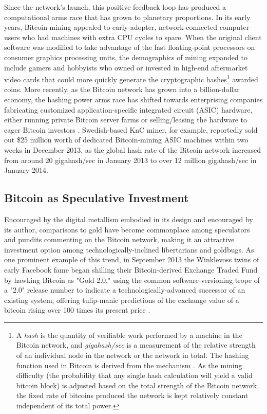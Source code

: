 Since the network's launch, this positive feedback loop has produced a computational arms race that has grown to planetary proportions. In its early years, Bitcoin mining appealed to early-adopter, network-connected computer users who had machines with extra CPU cycles to spare. When the original client software was modified to take advantage of the fast floating-point processors on consumer graphics processing units, the demographics of mining expanded to include gamers and hobbyists who owned or invested in high-end aftermarket video cards that could more quickly generate the cryptographic hashes\footnote{
  A \emph{hash} is the quantity of verifiable work performed by a machine in the Bitcoin network, and \emph{gigahash/sec} is a measurement of the relative strength of an individual node in the network or the network in total. The hashing function used in Bitcoin is derived from the  mechanism \autocite{Hashcash}. As the mining difficulty (the probability that any single hash calculation will yield a valid bitcoin block) is adjusted based on the total strength of the Bitcoin network, the fixed rate of bitcoins produced the network is kept relatively constant independent of its total power.
} awarded coins. More recently, as the Bitcoin network has grown into a billion-dollar economy, the hashing power arms race has shifted towards enterprising companies fabricating customized application-specific integrated circuit (ASIC) hardware, either running private Bitcoin server farms or selling/leasing the hardware to eager Bitcoin investors \autocite{Hill14}. Swedish-based KnC miner, for example, reportedly sold out \$25 million worth of dedicated Bitcoin-mining ASIC machines within two weeks in December 2013, as the global hash rate of the Bitcoin network increased from around 20 gigahash/sec in January 2013 to over 12 million gigahash/sec in January 2014.

\subsection*{Bitcoin as Speculative Investment}
Encouraged by the digital metallism embodied in its design and encouraged by its author, comparisons to gold have become commonplace among speculators and pundits commenting on the Bitcoin network, making it an attractive investment option among technologically-inclined libertarians and goldbugs. As one prominent example of this trend, in September 2013 the Winklevoss twins of early Facebook fame began shilling their Bitcoin-derived Exchange Traded Fund by hawking Bitcoin as "Gold 2.0," using the common software-versioning trope of a "2.0" release number to indicate a technologically-advanced successor of an existing system, offering tulip-manic predictions of the exchange value of a bitcoin rising over 100 times its present price \autocite{Farrell13}.

